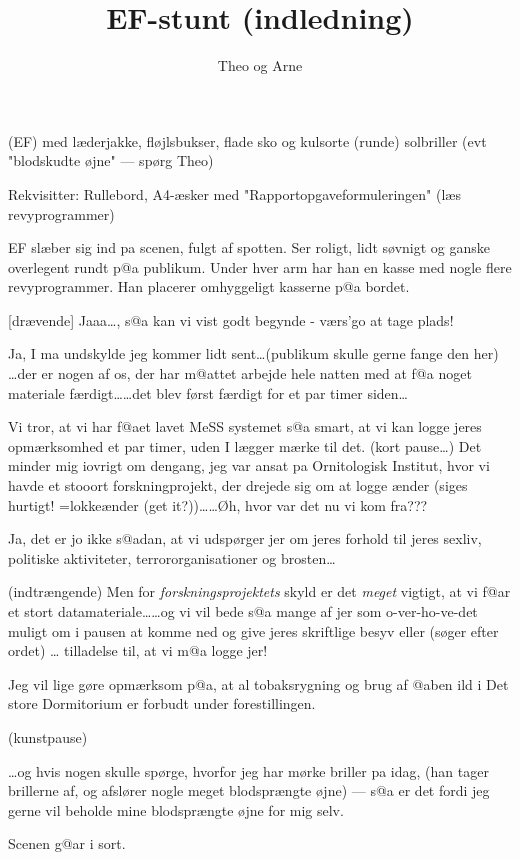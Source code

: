 \documentclass[a4paper,11pt]{article}
\title{EF-stunt (indledning)}
\author{Theo og Arne}
\begin{document}
\maketitle

\begin{roles}

 (EF) med læderjakke, fløjlsbukser, flade sko og
kulsorte (runde) solbriller (evt "blodskudte øjne" --- spørg Theo)
\end{roles}

Rekvisitter: Rullebord, A4-æsker med "Rapportopgaveformuleringen" (læs
revyprogrammer)

\begin{sketch}

\scene EF slæber sig ind pa scenen, fulgt af spotten. Ser roligt, lidt
søvnigt og ganske overlegent rundt p@a publikum. Under hver arm har han en
kasse med nogle flere revyprogrammer. Han placerer omhyggeligt kasserne p@a
bordet.

[drævende] Jaaa\dots, s@a kan vi vist godt begynde - værs'go at tage
plads!

Ja, I ma undskylde jeg kommer lidt sent\dots (publikum skulle gerne fange den
her) \dots der er nogen af os, der har m@attet arbejde hele natten med at f@a
noget materiale færdigt\dots \dots det blev først færdigt for et par timer
siden\dots

Vi tror, at vi har f@aet lavet MeSS systemet s@a smart, at vi kan logge
jeres opmærksomhed et par timer, uden I lægger mærke til det. (kort
pause\dots ) Det minder mig iovrigt om dengang, jeg var ansat pa
Ornitologisk Institut, hvor vi havde et stooort forskningprojekt, der
drejede sig om at logge ænder (siges hurtigt! =lokkeænder (get
it?))\dots \dots Øh, hvor var det nu vi kom fra???

Ja, det er jo ikke s@adan, at vi udspørger jer om jeres forhold til jeres
sexliv, politiske aktiviteter, terrororganisationer og brosten\dots

(indtrængende) Men for {\em forskningsprojektets}\/ skyld er det
{\em meget}\/ vigtigt, at vi f@ar et stort datamateriale\dots \dots og vi vil
bede s@a mange af jer som o-ver-ho-ve-det muligt om i pausen at komme
ned og give jeres skriftlige besyv eller (søger efter ordet) \dots
tilladelse til, at vi m@a logge jer!

Jeg vil lige gøre opmærksom p@a, at al tobaksrygning og brug af @aben ild i
Det store Dormitorium er forbudt under forestillingen.

(kunstpause)

\dots og hvis nogen skulle spørge, hvorfor jeg har mørke briller pa
idag, (han tager brillerne af, og afslører nogle meget blodsprængte
øjne) --- s@a er det fordi jeg gerne vil beholde mine blodsprængte
øjne for mig selv.

Scenen g@ar i sort.

\end{sketch}
\end{document}
